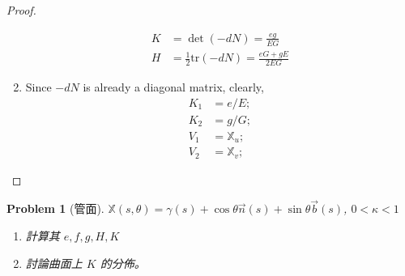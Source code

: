\documentclass[10pt,a4paper]{article}
\newcounter{theProblemCounter}
\newtheorem{problem}[theProblemCounter]{Problem}
\begin{document}
\begin{proof}
\begin{enumerate}
\begin{align*}
K &= \det(-dN) = \frac{eg}{EG} \\
H &= \frac 12\text{tr}(-dN) = \frac{eG + gE}{2EG}
\end{align*}
\item[(b)]
Since $-dN$ is already a diagonal matrix, clearly, \begin{align*}
K_1 &= e/E; \\
K_2 &= g/G; \\
V_1 &= \mathbb{X}_u; \\
V_2 &= \mathbb{X}_v;
\end{align*}
\end{enumerate}
\end{proof}

\setcounter{theProblemCounter}{9}
\begin{problem}[管面]
$\mathbb{X}(s,\theta) = \gamma(s)+\cos\theta\vec{n}(s) + \sin\theta\vec{b}(s)$, $0<\kappa < 1$
\begin{enumerate}
\item[(a)] 計算其 $e, f, g, H, K$
\item[(b)] 討論曲面上 $K$ 的分佈。
\end{enumerate}
\end{problem}
\end{document}
